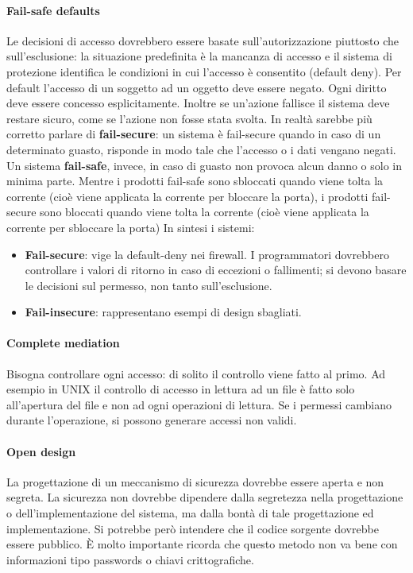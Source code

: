 \paragraph{Fail-safe defaults}
Le decisioni di accesso dovrebbero essere basate sull'autorizzazione
piuttosto che sull'esclusione: la situazione predefinita è la mancanza di accesso
e il sistema
di protezione identifica le condizioni in cui l'accesso è consentito
(default deny).
Per default l'accesso di un soggetto ad un oggetto deve essere negato.
Ogni diritto deve essere concesso esplicitamente.
Inoltre se un'azione fallisce il sistema deve restare sicuro, come se
l'azione non fosse stata svolta.
In realtà sarebbe più corretto parlare di \textbf{fail-secure}: un sistema
è fail-secure quando in caso di un
determinato guasto, risponde in modo tale che l'accesso o i dati vengano negati.
Un sistema \textbf{fail-safe}, invece, in caso di guasto non provoca alcun danno
o solo in minima parte.
Mentre i prodotti fail-safe sono sbloccati quando viene tolta la corrente
(cioè viene applicata la corrente per bloccare la porta), i prodotti
fail-secure sono bloccati quando viene tolta la corrente
(cioè viene applicata la corrente per sbloccare la porta)
In sintesi i sistemi:

\begin{itemize}
    \item \textbf{Fail-secure}: vige la default-deny nei firewall.
          I programmatori dovrebbero controllare i valori
          di ritorno in caso di eccezioni o fallimenti; si devono basare le
          decisioni sul permesso, non
          tanto sull'esclusione.
    \item \textbf{Fail-insecure}: rappresentano esempi di design sbagliati.
\end{itemize}

\paragraph{Complete mediation}
Bisogna controllare ogni accesso: di solito il controllo viene fatto al primo.
Ad esempio in UNIX il
controllo di accesso in lettura ad un file è fatto solo all'apertura del file e
non ad ogni operazioni di lettura.
Se i permessi cambiano durante l'operazione, si possono generare accessi non
validi.

\paragraph{Open design}
La progettazione di un meccanismo di sicurezza dovrebbe essere aperta e
non segreta.
La sicurezza non dovrebbe dipendere dalla segretezza nella progettazione o
dell'implementazione del sistema, ma dalla bontà di tale progettazione ed
implementazione. Si potrebbe però intendere
che il codice sorgente dovrebbe essere pubblico.
È molto importante ricorda che questo metodo non va bene con informazioni
tipo passwords o chiavi crittografiche.


